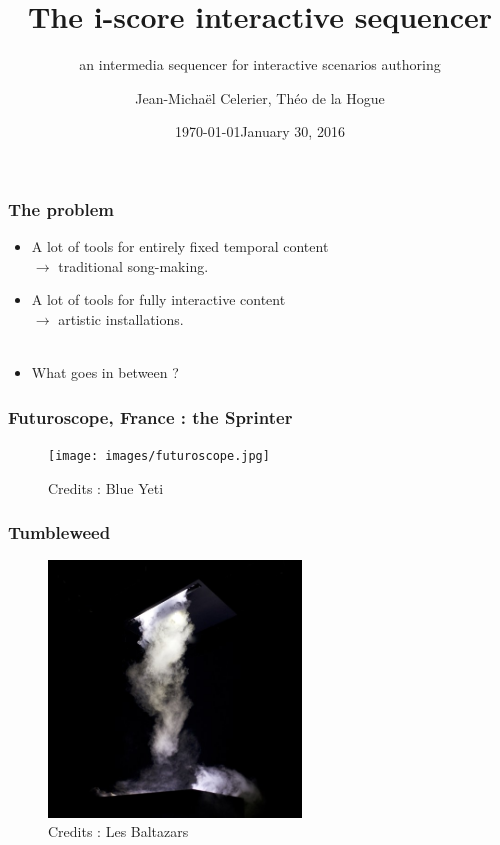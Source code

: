 \documentclass{beamer}
\title{The i-score interactive sequencer}
\subtitle{an intermedia sequencer for interactive scenarios authoring}
\date{\today}
\author{Jean-Michaël Celerier, Théo de la Hogue}
\institute{LaBRI, Blue Yeti, GMEA }
\date{January 30, 2016}
\begin{document}
    
\maketitle

\begin{frame}
    \frametitle{The problem}    
    \Large
    \begin{itemize}
    	\item<1-> A lot of tools for entirely fixed temporal content \\ $\rightarrow$ traditional song-making.
    	\item<2-> A lot of tools for fully interactive content  \\  $\rightarrow$ artistic installations.~\\~\\
    	\item<3-> What goes in between ?    	
    \end{itemize}    
\end{frame}

\begin{frame}
    \frametitle{Futuroscope, France : the Sprinter}        

    \begin{figure}
        \centering
        \texttt{[image: images/futuroscope.jpg]}
        \caption{Credits : Blue Yeti}
    \end{figure}
\end{frame}


\begin{frame}
    \frametitle{Tumbleweed}       
    
    \begin{figure}
    	\centering
    	\includegraphics[width=0.6\textwidth]{images/tumbleweed.jpg}
    	\caption{Credits : Les Baltazars}
    \end{figure}
\end{frame}
\end{document}
